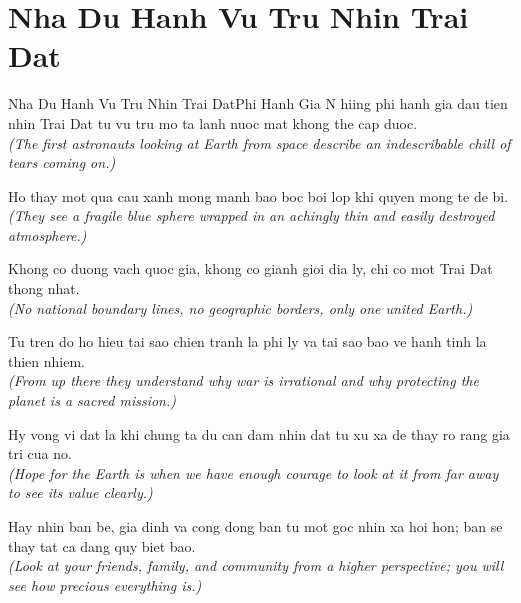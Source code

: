 \section{Nha Du Hanh Vu Tru Nhin Trai Dat}
\begin{truyen}{Nha Du Hanh Vu Tru Nhin Trai Dat}{Phi Hanh Gia}
N hiing phi hanh gia dau tien nhin Trai Dat tu vu tru mo ta lanh nuoc mat khong the cap duoc.\\
\textit{(The first astronauts looking at Earth from space describe an indescribable chill of tears coming on.)}

Ho thay mot qua cau xanh mong manh bao boc boi lop khi quyen mong te de bi.\\
\textit{(They see a fragile blue sphere wrapped in an achingly thin and easily destroyed atmosphere.)}

Khong co duong vach quoc gia, khong co gianh gioi dia ly, chi co mot Trai Dat thong nhat.\\
\textit{(No national boundary lines, no geographic borders, only one united Earth.)}

Tu tren do ho hieu tai sao chien tranh la phi ly va tai sao bao ve hanh tinh la thien nhiem.\\
\textit{(From up there they understand why war is irrational and why protecting the planet is a sacred mission.)}

Hy vong vi dat la khi chung ta du can dam nhin dat tu xu xa de thay ro rang gia tri cua no.\\
\textit{(Hope for the Earth is when we have enough courage to look at it from far away to see its value clearly.)}

\end{truyen}
\begin{baihoc}
  Hay nhin ban be, gia dinh va cong dong ban tu mot goc nhin xa hoi hon; ban se thay tat ca dang quy biet bao.\\
  \textit{(Look at your friends, family, and community from a higher perspective; you will see how precious everything is.)}
\end{baihoc}

